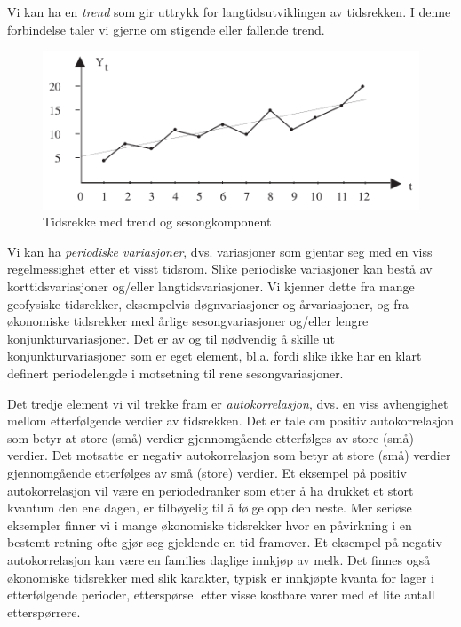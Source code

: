Vi kan ha en {\em trend} som gir uttrykk for langtidsutviklingen av 
tidsrekken.  I denne forbindelse taler vi gjerne om stigende eller fallende
trend.

\begin{figure}[ht]
\centering
   \includegraphics[scale=0.6]{figurer/fig13_1.pdf} 
 \caption{Tidsrekke med trend og sesongkomponent}
	\label{fig:sesong}
\end{figure}

Vi kan ha {\em periodiske variasjoner}, dvs. variasjoner som gjentar seg
med en viss regelmessighet etter et visst tidsrom.  Slike periodiske
varia\-sjoner kan bestå av korttidsvariasjoner og/eller langtidsvariasjoner.
Vi kjenner dette fra mange geofysiske tidsrekker, eksempelvis 
døgnvariasjoner og årvariasjoner, og fra økonomiske tidsrekker med
årlige sesongvariasjoner og/eller lengre konjunkturvariasjoner.  Det er
av og til nødvendig å skille ut konjunkturvariasjoner som er eget
element, bl.a. fordi slike ikke har en klart definert periodelengde i 
motsetning til rene sesongvariasjoner.

Det tredje element vi vil trekke fram er {\em autokorrelasjon}, dvs. en viss
avhengighet mellom etterfølgende verdier av tidsrekken.  Det er tale om
positiv autokorrelasjon som betyr at store (små) verdier 
gjennomgående etterfølges av store (små) verdier.  Det motsatte
er negativ autokorrelasjon som betyr at store (små) verdier 
gjennomgående etterfølges av små (store) verdier.  Et eksempel
på positiv autokorrelasjon vil være en periodedranker som etter
å ha drukket et stort kvantum den ene dagen, er tilbøyelig til å
følge opp den neste.  Mer seriøse eksempler finner vi i mange 
økonomiske tidsrekker hvor en påvirkning i en bestemt retning ofte
gjør seg gjeldende en tid framover.  Et eksempel på negativ 
autokorrelasjon kan være en fa\-mi\-lies daglige innkjøp av melk.  Det
finnes også økonomiske tidsrekker med slik karakter, typisk er 
innkjøpte kvanta for lager i etterfølgende perioder, etterspørsel
etter visse kostbare varer med et lite antall etterspørrere.

